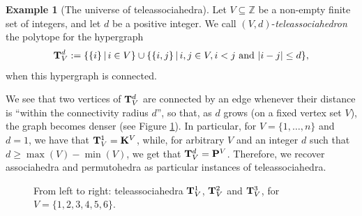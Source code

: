 \documentclass{article}
\theoremstyle{plain}
\theoremstyle{definition}
\newtheorem{example}[thm]{\sc Example}
\newcommand{\inc}{\subseteq}
\newcommand{\set}[1]{\{#1\}}
\newcommand{\hyper}[1]{{\bf #1}}
\begin{document}
\begin{example}[The universe of teleassociahedra]\label{teleass}
Let $V\inc\mathbb{Z}$ be a non-empty finite set of integers, and let $d$ be a positive integer. We call $(V,d)$-\emph{teleassociahedron} the polytope for the hypergraph
\begin{equation}
    \hyper{T}^d_V:=\{\{i\}\,|\, i \in V\} \cup \{\{i,j\}\,|\, i,j \in V, i < j \mbox{ and } |i-j| \leq d\},
\end{equation}
when this hypergraph is connected.  

We see that two vertices of $\hyper{T}^d_V$  are connected by an edge whenever their distance is ``within the connectivity radius $d$'', so that, as $d$ grows (on a fixed vertex set $V$), the graph becomes denser (see Figure \ref{tas}). In particular,  for $V=\set{1,\ldots,n}$ and $d=1$, we have that $\hyper{T}^1_V={\bf K}^V$, while, for arbitrary $V$ and an integer $d$ such that
$d\geq \max(V)-\min(V)$,  we get that $\hyper{T}^d_V={\bf P}^V$. Therefore, we recover associahedra and permutohedra as particular instances of teleassociahedra. 

\begin{figure}[H]
\centering
{} \quad {} \quad {}
\caption{From left to right: teleassociahedra $\hyper{T}^1_{V}$, $\hyper{T}^2_{V}$ and $\hyper{T}^3_{V}$, for $V=\set{1,2,3,4,5,6}$.}\label{tas}
\end{figure}


\end{example}
\end{document}
